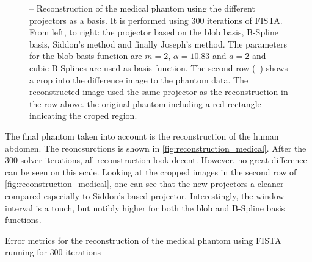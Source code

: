 \begin{figure}

	\caption{--
                Reconstruction of the medical phantom using the different projectors as a basis. It
                is performed using \(300\) iterations of \gls{FISTA}. From left, to right: the
                projector based on the blob basis, B-Spline basis, Siddon's method and finally
                Joseph's method. The parameters for the blob basis function are \(m=2\),
                \(\alpha=10.83\) and \(a=2\) and cubic B-Splines are used as basis function. The
                second row
		(--)
		shows a crop into the difference image to the phantom data. The reconstructed image
		used the same projector as the reconstruction in the row above.
		 the original phantom including a red rectangle
		indicating the croped region.
	}%
	\label{fig:reconstruction_medical}
\end{figure}

The final phantom taken into account is the reconstruction of the human abdomen. The reoncsurctions
is shown in \autoref{fig:reconstruction_medical}. After the \(300\) solver iterations, all
reconstruction look decent. However, no great difference can be seen on this scale. Looking at the
cropped images in the second row of \autoref{fig:reconstruction_medical}, one can see that the new
projectors a cleaner compared especially to Siddon's based projector. Interestingly, the window
interval is a touch, but notibly higher for both the blob and B-Spline basis functions.

\begin{table}[h]%
	\centering
	\caption{Error metrics for the reconstruction of the medical phantom using FISTA running for
		\(300\) iterations}%
	\label{tab:error_metric_medical}
\end{table}

